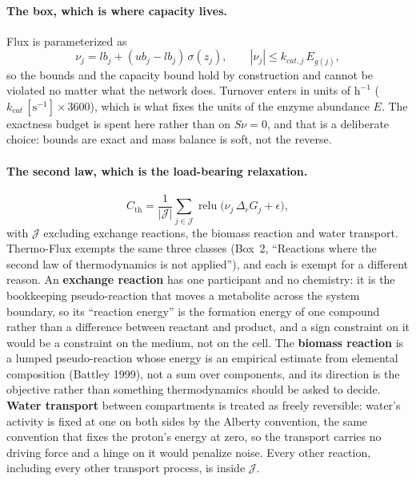 \paragraph{The box, which is where capacity lives.} Flux is parameterized as
\begin{equation}
  \nu_j = lb_j + (ub_j - lb_j)\,\sigma(z_j),
  \qquad
  |\nu_j| \le k_{cat,j}\,E_{g(j)},
\end{equation}
so the bounds and the capacity bound hold by construction and cannot be violated no matter
what the network does. Turnover enters in units of $\mathrm{h}^{-1}$
($k_{cat}\,[\mathrm{s}^{-1}] \times 3600$), which is what fixes the units of the enzyme
abundance $E$. The exactness budget is spent here rather than on $S\nu = 0$, and that is a
deliberate choice: bounds are exact and mass balance is soft, not the reverse.

\paragraph{The second law, which is the load-bearing relaxation.}
\begin{equation}
  C_{\mathrm{th}} = \frac{1}{|\mathcal{J}|}\sum_{j\in\mathcal{J}}
    \operatorname{relu}\!\big(\nu_j\,\Delta_r G_j + \epsilon\big),
\end{equation}
with $\mathcal{J}$ excluding exchange reactions, the biomass reaction and water transport.
Thermo-Flux exempts the same three classes (Box~2, ``Reactions where the second law of
thermodynamics is not applied''), and each is exempt for a different reason. An
\textbf{exchange reaction} has one participant and no chemistry: it is the bookkeeping
pseudo-reaction that moves a metabolite across the system boundary, so its ``reaction
energy'' is the formation energy of one compound rather than a difference between reactant
and product, and a sign constraint on it would be a constraint on the medium, not on the
cell. The \textbf{biomass reaction} is a lumped pseudo-reaction whose energy is an
empirical estimate from elemental composition (Battley 1999), not a sum over components,
and its direction is the objective rather than something thermodynamics should be asked to
decide. \textbf{Water transport} between compartments is treated as freely reversible:
water's activity is fixed at one on both sides by the Alberty convention, the same
convention that fixes the proton's energy at zero, so the transport carries no driving
force and a hinge on it would penalize noise. Every other reaction, including every other
transport process, is inside $\mathcal{J}$.

